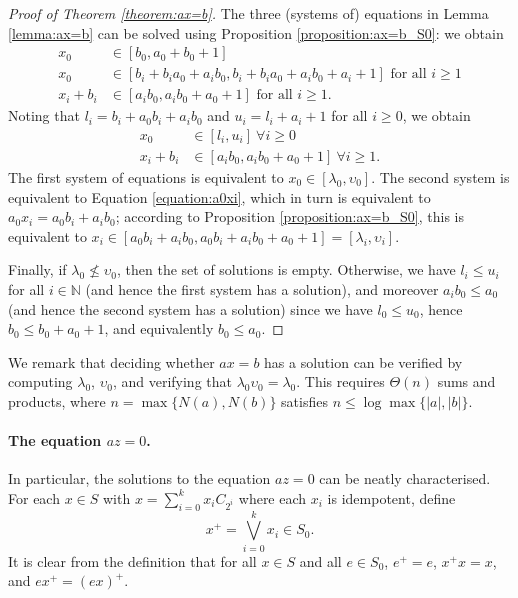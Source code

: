 \documentclass[a4paper, 11pt]{article}
\theoremstyle{plain}
\theoremstyle{definition}
\newcommand{\N} {\mathbb{N}}
\begin{document}
\begin{proof}[Proof of Theorem \ref{theorem:ax=b}]
The three (systems of) equations in Lemma \ref{lemma:ax=b} can be solved using Proposition \ref{proposition:ax=b_S0}: we obtain
\begin{align}
    \label{equation:a0x0_solved}
    x_0 &\in [b_0, a_0 + b_0 + 1] \\
    \label{equation:aix0_solved}
    x_0 &\in [b_i + b_i a_0 + a_ib_0, b_i + b_i a_0 + a_ib_0 + a_i + 1] \text{ for all } i \ge 1\\
    \label{equation:a0xi_solved}
    x_i + b_i &\in [a_i b_0, a_i b_0 + a_0 + 1] \text{ for all } i \ge 1.
\end{align}
Noting that $l_i = b_i + a_0 b_i + a_i b_0$ and $u_i = l_i + a_i + 1$ for all $i \ge 0$, we obtain
\begin{align*}
    x_0 &\in [l_i, u_i] \ \forall i \ge 0 \\
    x_i + b_i &\in [a_i b_0, a_i b_0 + a_0 + 1] \ \forall i \ge 1.
\end{align*}
The first system of equations is equivalent to $x_0 \in [ \lambda_0, \upsilon_0 ]$. The second system is equivalent to Equation \eqref{equation:a0xi}, which in turn is equivalent to $a_0 x_i = a_0b_i + a_i b_0$; according to Proposition \ref{proposition:ax=b_S0}, this is equivalent to $x_i \in [a_0b_i + a_i b_0, a_0b_i + a_i b_0 + a_0 + 1] = [\lambda_i, \upsilon_i]$.

Finally, if $\lambda_0 \not\le \upsilon_0$, then the set of solutions is empty. Otherwise, we have $l_i \le u_i$ for all $i \in \N$ (and hence the first system has a solution), and moreover $a_i b_0 \le a_0$ (and hence the second system has a solution) since we have $l_0 \le u_0$, hence $b_0 \le b_0 + a_0 + 1$, and equivalently $b_0 \le a_0$. 
\end{proof}


We remark that deciding whether $ax = b$ has a solution can be verified by computing $\lambda_0$, $\upsilon_0$, and verifying that $\lambda_0 \upsilon_0 = \lambda_0$. This requires $\Theta(n)$ sums and products, where $n = \max\{ N(a),  N(b) \}$ satisfies $n \le \log \max \{ |a|, |b| \}$.


\paragraph{The equation $az=0$.} 
In particular, the solutions to the equation $az = 0$ can be neatly characterised. For each $x \in S$ with $x=\sum_{i=0}^k x_i C_{2^i}$ where each $x_i$ is idempotent, define
\[
    x^+ = \bigvee_{i=0}^k x_i \in S_0. 
\]
It is clear from the definition that for all $x \in S$ and all $e \in S_0$, $e^+ = e$, $x^+ x = x$, and $e x^+ = (ex)^+$. 
\end{document}
